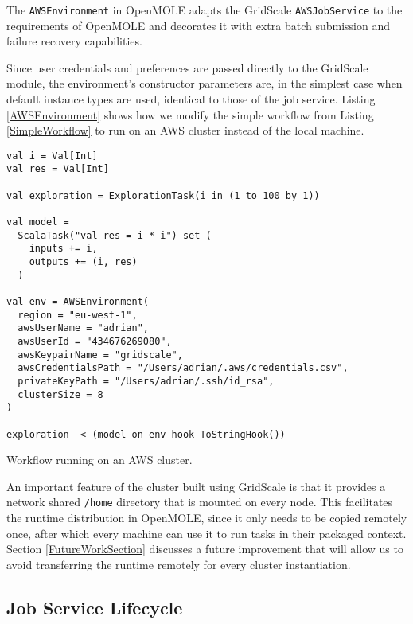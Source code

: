 The \verb|AWSEnvironment| in OpenMOLE adapts the GridScale \verb|AWSJobService| to the requirements of OpenMOLE and decorates it with extra batch submission and failure recovery capabilities. 

Since user credentials and preferences are passed directly to the GridScale module, the environment's constructor parameters are, in the simplest case when default instance types are used, identical to those of the job service. Listing \ref{AWSEnvironment} shows how we modify the simple workflow from Listing \ref{SimpleWorkflow} to run on an AWS cluster instead of the local machine.

\begin{listing}[h]
	\centering
	\begin{minipage}{11.4cm}
		\begin{verbatim}
val i = Val[Int]
val res = Val[Int]

val exploration = ExplorationTask(i in (1 to 100 by 1))

val model =
  ScalaTask("val res = i * i") set (
    inputs += i,
    outputs += (i, res)
  )

val env = AWSEnvironment(
  region = "eu-west-1",
  awsUserName = "adrian",
  awsUserId = "434676269080",
  awsKeypairName = "gridscale",
  awsCredentialsPath = "/Users/adrian/.aws/credentials.csv",
  privateKeyPath = "/Users/adrian/.ssh/id_rsa",
  clusterSize = 8
)
  
exploration -< (model on env hook ToStringHook())
		\end{verbatim}
	\end{minipage}
	\caption{Workflow running on an AWS cluster.}
	\label{AWSEnvironment}
\end{listing}

An important feature of the cluster built using GridScale is that it provides a network shared \verb|/home| directory that is mounted on every node. This facilitates the runtime distribution in OpenMOLE, since it only needs to be copied remotely once, after which every machine can use it to run tasks in their packaged context. Section \ref{FutureWorkSection} discusses a future improvement that will allow us to avoid transferring the runtime remotely for every cluster instantiation.

\subsection{Job Service Lifecycle}

